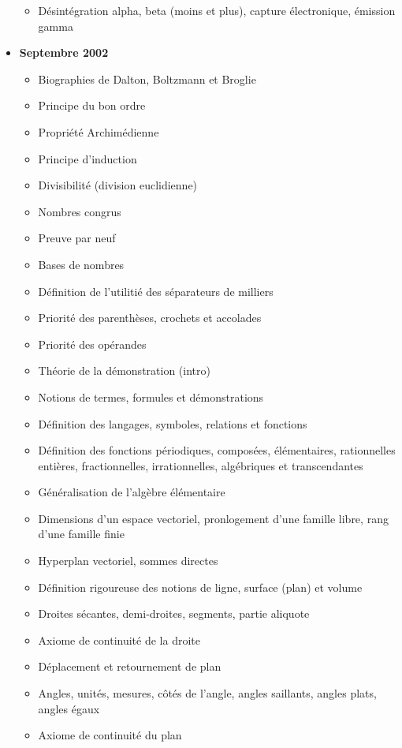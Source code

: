 \documentclass[12pt,a4paper,twoside,openright]{report}
\theoremstyle{definition}
\theoremstyle{itexmp}
\numberwithin{equation}{section}
\begin{document}
\begin{itemize}
\begin{itemize}[noitemsep]
				\item Désintégration alpha, beta (moins et plus), capture électronique, émission gamma
			\end{itemize}
		\item \textbf{Septembre 2002}	
			\begin{itemize}[noitemsep]
				\item Biographies de Dalton, Boltzmann et Broglie
				\item Principe du bon ordre
				\item Propriété Archimédienne
				\item Principe d'induction
				\item Divisibilité (division euclidienne)
				\item Nombres congrus
				\item Preuve par neuf
				\item Bases de nombres
				\item Définition de l'utilitié des séparateurs de milliers
				\item Priorité des parenthèses, crochets et accolades
				\item Priorité des opérandes
				\item Théorie de la démonstration (intro)
				\item Notions de termes, formules et démonstrations
				\item Définition des langages, symboles, relations et fonctions
				\item Définition des fonctions périodiques, composées, élémentaires, rationnelles entières, fractionnelles, irrationnelles, algébriques et transcendantes
				\item Généralisation de l'algèbre élémentaire
				\item Dimensions d'un espace vectoriel, pronlogement d'une famille libre, rang d'une famille finie
				\item Hyperplan vectoriel, sommes directes
				\item Définition rigoureuse des notions de ligne, surface (plan) et volume
				\item Droites sécantes, demi-droites, segments, partie aliquote
				\item Axiome de continuité de la droite
				\item Déplacement et retournement de plan
				\item Angles, unités, mesures, côtés de l'angle, angles saillants, angles plats, angles égaux
				\item Axiome de continuité du plan

\end{itemize}
\end{itemize}
\end{document}
